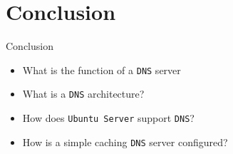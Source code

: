 \documentclass[aspectratio=169]{beamer}
\begin{document}
\section*{Conclusion}
\begin{frame}{Conclusion}
  \begin{itemize}
    \item What is the function of a \texttt{DNS} server
    \item What is a \texttt{DNS} architecture?
    \item How does \texttt{Ubuntu Server} support \texttt{DNS}?
    \item How is a simple caching \texttt{DNS} server configured?
  \end{itemize}
\end{frame}
\end{document}

